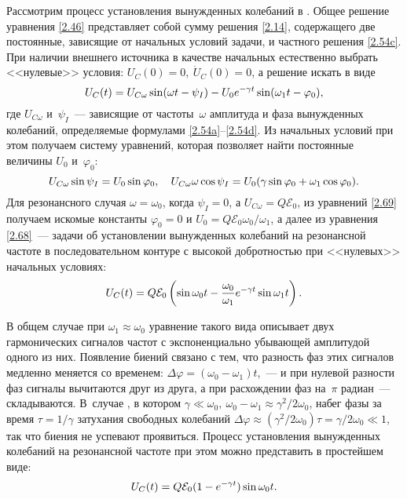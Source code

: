 Рассмотрим процесс установления вынужденных колебаний в
. Общее решение уравнения
\eqref{2.46} представляет собой сумму решения \eqref{2.14}, содержащего две
постоянные, зависящие от начальных условий задачи, и частного решения
\eqref{2.54c}. При наличии внешнего источника в качестве начальных естественно
выбрать <<нулевые>> условия: $U_C(0)=0,~\dot U_C(0)=0$, а решение искать в виде
\begin{equation}
	\eqmark{2.68}
	U_C(t)=U_{C\omega}\sin(\omega t-\psi_I)-U_0 e^{-\gamma
t}\sin(\omega_1t-\varphi_0),
\end{equation}
где $U_{C\omega}$ и~$\psi_I$~--- зависящие от частоты~$\omega$ амплитуда и фаза
вынужденных колебаний, определяемые формулами 
\eqref{2.54a}--\eqref{2.54d}. Из начальных условий
при этом получаем систему уравнений, которая позволяет найти постоянные величины
$U_0$ и~$\varphi_0$:
\begin{equation}
	\eqmark{2.69}
	U_{C\omega}\sin\psi_I=U_0 \sin\varphi_0, \quad
U_{C\omega}\omega\cos\psi_I=U_0 (\gamma\sin\varphi_0+\omega_1\cos\varphi_0).
\end{equation}
Для резонансного случая $\omega=\omega_0$, когда 
$\psi_I=0$, а $U_{C\omega}=Q\mathcal{E}_0$, из уравнений \eqref{2.69} получаем
искомые константы $\varphi_0=0$ и $U_0 =Q\mathcal{E}_0\omega_0/\omega_1$, а далее
из уравнения \eqref{2.68}~---  задачи об установлении
вынужденных колебаний на резонансной частоте в последовательном контуре с
высокой добротностью при <<нулевых>> начальных условиях:
\begin{equation}
	\eqmark{2.70}
	U_{C}(t)=Q\mathcal{E}_0\left(\sin\omega_0t-\frac{\omega_0}{\omega_1}e^{-\gamma
t}\sin\omega_1 t \right).
\end{equation}

В общем случае при $\omega_1\approx\omega_0$ уравнение такого вида описывает
 двух гармонических сигналов  частот с
экспоненциально убывающей амплитудой одного из них. Появление биений связано с
тем, что разность фаз этих сигналов медленно меняется со временем:
$\Delta\varphi=(\omega_0-\omega_1)t$,~--- и при нулевой разности фаз сигналы
вычитаются друг из друга, а при расхождении фаз на~$\pi$
радиан~--- складываются. В~случае , в котором
$\gamma\ll\omega_0,~\omega_0-\omega_1\approx\gamma^2/2\omega_0$, набег фазы за
время $\tau=1/\gamma$ затухания свободных колебаний
$\Delta\varphi\approx(\gamma^2/2\omega_0)\tau=\gamma/2\omega_0\ll1$,  так что
биения не успевают проявиться. Процесс установления вынужденных колебаний на
резонансной частоте при этом можно представить в простейшем виде:
\begin{equation}\eqmark{2.71}
	U_C(t)=Q\mathcal{E}_0(1-e^{-\gamma t})\sin\omega_0 t.
\end{equation}

